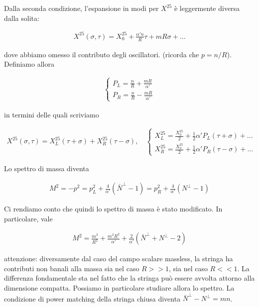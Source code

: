 \documentclass{report}
\begin{document}
Dalla seconda condizione, l'espansione in modi per \(X^{25}\) è leggermente diversa dalla solita: 

\begin{align}
    X^{25}(\sigma, \tau) = X_0^{25} + \frac{\alpha' n}{R}\tau + mR\sigma + \ldots
\end{align}

dove abbiamo omesso il contributo degli oscillatori. (ricorda che \(p = n/R\)). Definiamo allora 

\begin{align}
    \begin{cases}
        P_L = \frac{n}{R} + \frac{m R}{\alpha'} \\ 
        P_R = \frac{n}{R} - \frac{mR}{\alpha'}
    \end{cases}
\end{align}

in termini delle quali scriviamo 

\begin{align}
    X^{25}(\sigma, \tau) = X^{25}_L (\tau+\sigma) + X^{25}_R (\tau-\sigma), \quad \begin{cases}
        X^{25}_L = \frac{X_0^{25}}{2} + \frac{1}{2}\alpha' P_L (\tau + \sigma) + \ldots \\ 
        X^{25}_R = \frac{X_0^{25}}{2} + \frac{1}{2}\alpha' P_R (\tau - \sigma) + \ldots
    \end{cases}
\end{align}

Lo spettro di massa diventa 

\begin{align}
    M^2 = -p^2 = p^2_L + \frac{4}{\alpha'}(\bar{N}^\perp -1) = p^2_R + \frac{4}{\alpha'}(N^\perp -1)
\end{align}

Ci rendiamo conto che quindi lo spettro di massa è stato modificato. In particolare, vale 

\begin{align}
    M^2 = \frac{m^2}{R^2} + \frac{m^2R^2}{\alpha'} + \frac{2}{\alpha'}(\bar{N}^\perp + N^\perp -2)
\end{align}

attenzione: diversamente dal caso del campo scalare massless, la stringa ha contributi non banali alla massa sia nel caso \(R >>1\), sia nel caso \(R << 1\). La differenza fondamentale sta nel fatto che la stringa può essere avvolta attorno alla dimensione compatta. Possiamo in particolare studiare allora lo spettro. La condizione di power matching della stringa chiusa diventa \(\bar{N}^\perp - N^\perp = mn \). 
\end{document}
